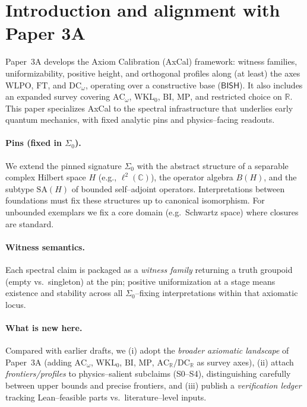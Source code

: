 \documentclass[11pt]{article}
\theoremstyle{plain}
\theoremstyle{definition}
\theoremstyle{remark}
\newcommand{\R}{\mathbb{R}}
\newcommand{\C}{\mathbb{C}}
\newcommand{\BISH}{\mathsf{BISH}}
\newcommand{\WLPO}{\mathrm{WLPO}}
\newcommand{\FT}{\mathrm{FT}}
\newcommand{\DCw}{\mathrm{DC}_\omega}
\newcommand{\ACw}{\mathrm{AC}_\omega}
\newcommand{\ACR}{\mathrm{AC}_{\mathbb{R}}}
\newcommand{\DCR}{\mathrm{DC}_{\mathbb{R}}}
\newcommand{\WKLz}{\mathrm{WKL}_0}
\newcommand{\BI}{\mathrm{BI}}
\newcommand{\MP}{\mathrm{MP}}
\newcommand{\SigmaZero}{\Sigma_{0}}
\begin{document}
\section{Introduction and alignment with Paper 3A}

Paper~3A \cite{Paper3A} develops the Axiom Calibration (AxCal) framework: witness families, uniformizability, positive height, and orthogonal profiles
along (at least) the axes $\WLPO$, $\FT$, and $\DCw$, operating over a constructive base ($\BISH$). It also includes an expanded survey covering $\ACw$, $\WKLz$, $\BI$, $\MP$, and restricted choice on $\R$.
This paper specializes AxCal to the spectral infrastructure that underlies early quantum mechanics,
with fixed analytic pins and physics--facing readouts.

\paragraph{Pins (fixed in $\SigmaZero$).}
We extend the pinned signature $\SigmaZero$ with the abstract structure of a separable complex Hilbert space $H$ (e.g., $\ell^2(\C)$), the operator algebra $B(H)$,
and the subtype $\mathrm{SA}(H)$ of bounded self--adjoint operators. Interpretations between foundations must fix these structures up to canonical isomorphism. For unbounded exemplars we fix a
core domain (e.g.\ Schwartz space) where closures are standard.

\paragraph{Witness semantics.}
Each spectral claim is packaged as a \emph{witness family} returning a truth groupoid (empty vs.\ singleton)
at the pin; positive uniformization at a stage means existence and stability across all $\SigmaZero$--fixing interpretations within that axiomatic locus.

\paragraph{What is new here.}
Compared with earlier drafts, we (i) adopt the \emph{broader axiomatic landscape} of Paper~3A (adding $\ACw$, $\WKLz$, $\BI$, $\MP$, $\ACR/\DCR$ as survey axes), (ii) attach \emph{frontiers/profiles} to physics--salient subclaims (S0--S4), distinguishing carefully between upper bounds and precise frontiers, and (iii) publish a \emph{verification ledger} tracking Lean--feasible parts vs.\ literature--level inputs.
\end{document}
